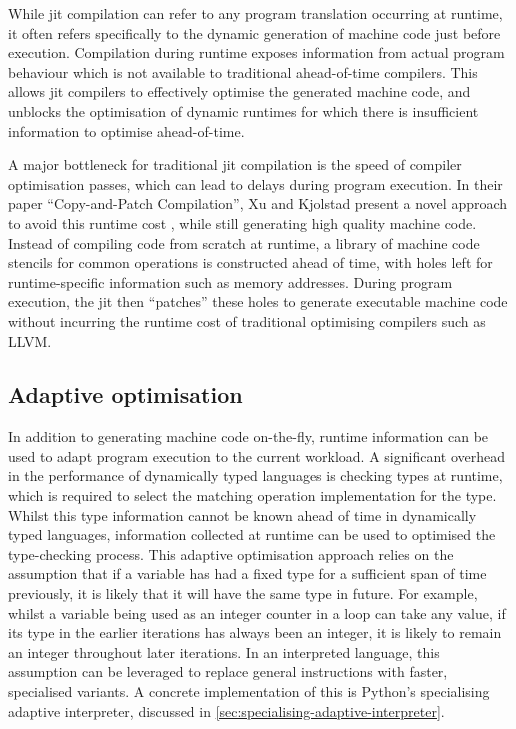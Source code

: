 While \acf{jit} compilation can refer to any program translation occurring at runtime, it often refers specifically to the dynamic generation of machine code just before execution.
Compilation during runtime exposes information from actual program behaviour which is not available to traditional ahead-of-time compilers.
This allows \ac{jit} compilers to effectively optimise the generated machine code, and unblocks the optimisation of dynamic runtimes for which there is insufficient information to optimise ahead-of-time.

A major bottleneck for traditional \ac{jit} compilation is the speed of compiler optimisation passes, which can lead to delays during program execution.
In their paper ``Copy-and-Patch Compilation'', Xu and Kjolstad present a novel approach to avoid this runtime cost \cite{xuCopyandpatchCompilationFast2021a}, while still generating high quality machine code.
Instead of compiling code from scratch at runtime, a library of machine code stencils for common operations is constructed ahead of time, with holes left for runtime-specific information such as memory addresses. During program execution, the \ac{jit} then ``patches'' these holes to generate executable machine code without incurring the runtime cost of traditional optimising compilers such as LLVM.


\subsection{Adaptive optimisation}
\label{ssec:adaptive-optimisation}

In addition to generating machine code on-the-fly, runtime information can be used to adapt program execution to the current workload.
A significant overhead in the performance of dynamically typed languages is checking types at runtime, which is required to select the matching operation implementation for the type.
Whilst this type information cannot be known ahead of time in dynamically typed languages, information collected at runtime can be used to optimised the type-checking process. This adaptive optimisation approach relies on the assumption that if a variable has had a fixed type for a sufficient span of time previously, it is likely that it will have the same type in future. For example, whilst a variable being used as an integer counter in a loop can take any value, if its type in the earlier iterations has always been an integer, it is likely to remain an integer throughout later iterations.
In an interpreted language, this assumption can be leveraged to replace general instructions with faster, specialised variants. A concrete implementation of this is Python's specialising adaptive interpreter, discussed in \autoref{sec:specialising-adaptive-interpreter}.
